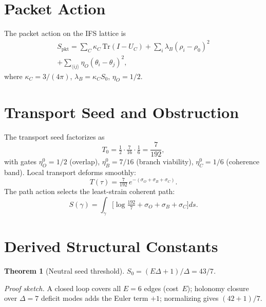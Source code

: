 \documentclass[11pt,twocolumn]{article}
\newtheorem{theorem}{Theorem}
\begin{document}
\section{Packet Action}
\label{sec:action}

The packet action on the IFS lattice is
\begin{multline}
S_{\mathrm{pkt}} = \sum_C \kappa_C\,\mathrm{Tr}(I{-}U_C) + \sum_i \lambda_B(\rho_i{-}\rho_0)^2 \\
+ \sum_{\langle ij\rangle}\eta_O(\theta_i{-}\theta_j)^2,
\label{eq:Spkt}
\end{multline}
where $\kappa_C=3/(4\pi)$, $\lambda_B=\kappa_C S_0$, $\eta_O=1/2$.

\section{Transport Seed and Obstruction}
\label{sec:transport}

The transport seed factorizes as
\begin{equation}
T_0 = \tfrac{1}{2}\cdot\tfrac{7}{16}\cdot\tfrac{1}{6} = \frac{7}{192},
\label{eq:seed}
\end{equation}
with gates $\eta_O^0=1/2$ (overlap), $\eta_B^0=7/16$ (branch viability), $\eta_C^0=1/6$ (coherence band).
Local transport deforms smoothly:
\begin{equation}
T(\tau) = \tfrac{7}{192}\,e^{-(\sigma_O+\sigma_B+\sigma_C)}.
\label{eq:deformed}
\end{equation}
The path action selects the least-strain coherent path:
\begin{equation}
S(\gamma) = \int_\gamma \!\Big[\log\!\tfrac{192}{7} + \sigma_O{+}\sigma_B{+}\sigma_C\Big]ds.
\label{eq:pathaction}
\end{equation}

\section{Derived Structural Constants}
\label{sec:constants}

\begin{theorem}[Neutral seed threshold]
\label{thm:S0}
$S_0 = (E\Delta+1)/\Delta = 43/7$.
\end{theorem}
\textit{Proof sketch.}
A closed loop covers all $E=6$ edges (cost~$E$); holonomy closure over $\Delta=7$ deficit modes adds the Euler term $+1$; normalizing gives $(42+1)/7$.
\end{document}
